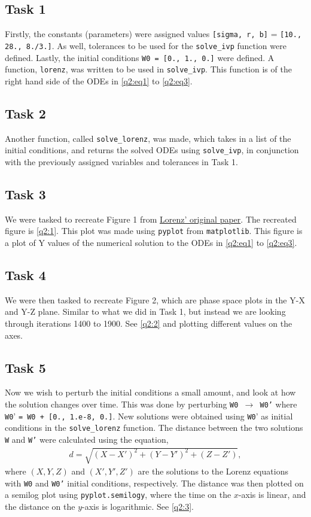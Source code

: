 \documentclass[a4paper,11pt]{article}
\theoremstyle{plain}
\theoremstyle{definition}
\theoremstyle{remark}
\begin{document}
\subsection*{Task 1}
Firstly, the constants (parameters) were assigned values
\texttt{[sigma, r, b]} = \texttt{[10., 28., 8./3.]}. 
As well, tolerances to be used for the \texttt{solve\_ivp}
function were defined. Lastly, the initial conditions
\texttt{W0 = [0., 1., 0.]} were defined. A function, \texttt{lorenz},
was written to be used
in \texttt{solve\_ivp}. This function is of
the right hand side of the ODEs in \cref{q2:eq1} to \cref{q2:eq3}.

\subsection*{Task 2}
Another function, called \texttt{solve\_lorenz}, was made,
which takes in a list of the initial conditions, and returns
the solved ODEs using \texttt{solve\_ivp}, in conjunction with
the previously assigned variables and tolerances in Task 1.

\subsection*{Task 3}
We were tasked to recreate Figure 1 from
\href{https://journals.ametsoc.org/view/journals/atsc/20/2/1520-0469_1963_020_0130_dnf_2_0_co_2.xml?tab_body=pdf}
{Lorenz' original paper}. The recreated figure is \cref{q2:1}. This
plot was made using \texttt{pyplot} from
\texttt{matplotlib}. This figure is a plot of Y values of the
numerical solution to the ODEs in \cref{q2:eq1} to \cref{q2:eq3}.



\subsection*{Task 4}
We were then tasked to recreate Figure 2, which are phase space
plots in the Y-X and Y-Z plane. Similar to what we did in Task 1,
but instead we are looking through iterations
1400 to 1900. See \cref{q2:2} and plotting different
values on the axes.

\subsection*{Task 5}
Now we wish to perturb the initial conditions
a small amount, and look at how the solution changes
over time. This was done by perturbing \texttt{W0 $\to$ W0'}
where \texttt{W0}' \texttt{= W0 + [0., 1.e-8, 0.]}. New solutions
were obtained using \texttt{W0}' as initial conditions
in the \texttt{solve\_lorenz} function. 
The distance between the two solutions \texttt{W} and \texttt{W'}
were calculated using the equation,
\begin{align*}
    d = \sqrt{(X-X')^2 + (Y-Y')^2 + (Z-Z')},
\end{align*}
where
$(X,Y,Z)$ and $(X', Y', Z')$ are the solutions to the Lorenz
equations with \texttt{W0} and \texttt{W0'} initial conditions,
respectively. The distance was then plotted
on a semilog plot using \texttt{pyplot.semilogy}, where
the time on the $x$-axis is linear, and the distance
on the $y$-axis is logarithmic. See \cref{q2:3}.
\end{document}
